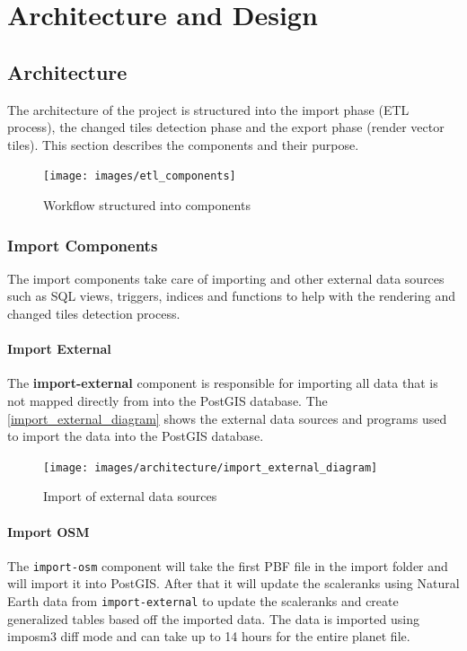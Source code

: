 \chapter{Architecture and Design}\label{design}

\section{Architecture}

The architecture of the project is structured into the import phase (ETL process), the changed tiles detection phase  and the export phase (render vector tiles). This section describes the components and their purpose.

\begin{figure}[H]
  \centering
  \texttt{[image: images/etl\_components]}
  \caption{Workflow structured into components}
\end{figure}

\subsection{Import Components}

The import components take care of importing \osm{} and other external data sources such as SQL views, triggers, indices and functions to help with the rendering and changed tiles detection process.

\subsubsection{Import External}

The \textbf{import-external} component is responsible for importing all data that is not mapped directly from \osm{} into the PostGIS database.
The \autoref{import_external_diagram} shows the external data sources and programs used to import the data into the PostGIS database.

\begin{figure}[H]
  \centering
  \texttt{[image: images/architecture/import\_external\_diagram]}
  \caption{Import of external data sources}
  \label{import_external_diagram} 
\end{figure}

\subsubsection{Import OSM}

The \texttt{import-osm} component will take the first PBF file in the import folder and will import it into PostGIS. After that it will update the scaleranks using Natural Earth data from \texttt{import-external} to update the scaleranks and create generalized tables based off the imported data. The data is imported using imposm3 diff mode and can take up to 14 hours for the entire planet file.

